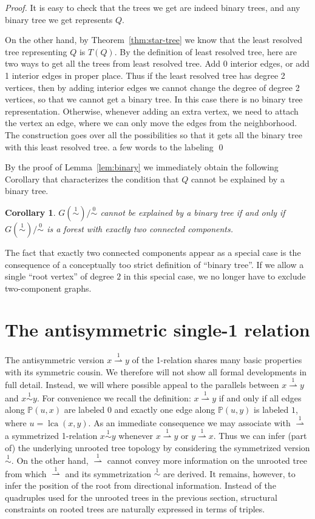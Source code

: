 \documentclass[smallextended]{svjour3}
\newcommand{\rev}[1]{\begingroup\color{blue}#1\endgroup}
\newcommand{\TODO}[1]{\begingroup\color{red}#1\endgroup}
\newcommand{\Ro}{\mathrel{\overset{0}{\sim}}}
\newcommand{\Rl}{\mathrel{\overset{1}{\sim}}}
\newcommand{\Rld}{\mathrel{\overset{1}{\rightharpoonup}}}
\newcommand{\lca}[1]{\mathop{lca}(#1)}
\newtheorem{cor}[thm]{Corollary}
\begin{document}
\begin{proof}
  It is easy to check that the trees we get are indeed binary trees, and
  any binary tree we get represents $Q$.
 
  On the other hand, by Theorem~\ref{thm:star-tree} we know that the least
  resolved tree representing $Q$ is $T(Q)$.  By the definition of least
  resolved tree, here are two ways to get all the trees from least resolved
  tree. Add 0 interior edges, or add 1 interior edges in proper place.
  Thus if the least resolved tree has degree 2 vertices, then by adding
  interior edges we cannot change the degree of degree 2 vertices, so that
  we cannot get a binary tree.  In this case there is no binary tree
  representation.  Otherwise, whenever adding an extra vertex, we need to
  attach the vertex an edge, where we can only move the edges from the
  neighborhood.  The construction goes over all the possibilities so that
  it gets all the binary tree with this least resolved tree. 
  \TODO{a few words to the labeling}
\qed
\end{proof}

By the proof of Lemma~\ref{lem:binary} we immediately obtain the following
Corollary that characterizes the condition that $Q$ cannot be explained by
a binary tree.
\begin{cor}
  $G(\Rl)/\Ro$ cannot be explained by a binary tree if and only if
  $G(\Rl)/\Ro$ \rev{is a forest with} exactly two connected components.
\end{cor}
The fact that exactly two connected components appear as a special case is
the consequence of a conceptually too strict definition of ``binary
tree''. If we allow a single ``root vertex'' of degree $2$ in this special
case, we no longer have to exclude two-component graphs.

\section{The antisymmetric single-1 relation}
\label{sect:1dir}

The antisymmetric version $x\Rld y$ of the 1-relation shares many basic
properties with its symmetric cousin. We therefore will not show all formal
developments in full detail. Instead, we will where possible appeal to the
parallels between $x\Rld y$ and $x\Rl y$. For convenience we recall the
definition: $x \Rld y$ if and only if all edges along $\mathbb{P}(u,x)$ are
labeled $0$ and exactly one edge along $\mathbb{P}(u,y)$ is labeled $1$,
where $u=\lca{x,y}$. As an immediate consequence we may associate with
$\Rld$ a symmetrized 1-relation $x\Rl y$ whenever $x\Rld y$ or $y\Rld
x$. Thus we can infer (part of) the underlying unrooted tree topology by
considering the symmetrized version $\Rl$. On the other hand, $\Rld$ cannot
convey more information on the unrooted tree from which $\Rld$ and its
symmetrization $\Rl$ are derived. It remains, however, to infer the
position of the root from directional information. Instead of the
quadruples used for the unrooted trees in the previous section, structural
constraints on rooted trees are naturally expressed in terms of triples.
\end{document}
